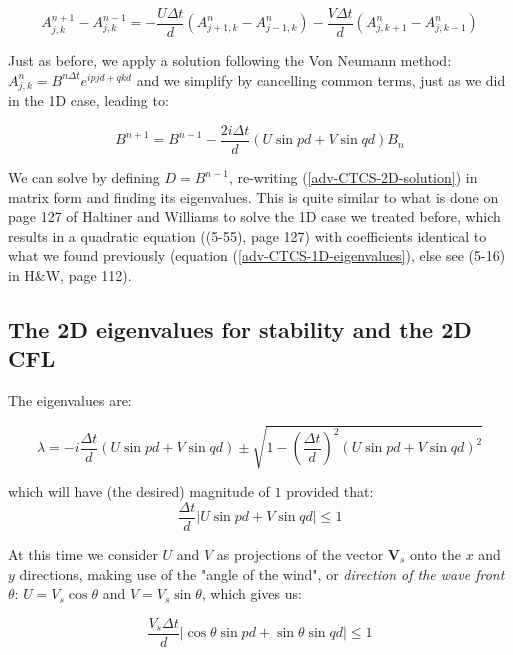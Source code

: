 	\begin{equation}
		{A_{j,k}^{n+1}-A_{j,k}^{n-1}} = - \frac{ U \Delta t}{d} \left( A_{j+1,k}^{n} - A_{j-1,k}^{n}  \right) - \frac{ V \Delta t}{d} \left( A_{j,k+1}^{n} - A_{j,k-1}^{n}  \right) 
		\label{adv-CTCS-2D}
	\end{equation}
	
	Just as before, we apply a solution following the Von Neumann method: ${A_{j,k}^{n}=B^{n \Delta t} e^{i pjd + qkd }}$ and we simplify by cancelling common terms, just as we did in the 1D case, leading to:
	
	\begin{equation}
		B^{n+1}  =  B^{n-1}  - \frac{2 i \Delta t}{d}  \left ( U \sin pd + V \sin qd \right) B_n
		\label{adv-CTCS-2D-solution}
	\end{equation}
	
	We can solve by defining $D=B^{n-1}$, re-writing (\ref{adv-CTCS-2D-solution}) in matrix form and finding its eigenvalues. This is quite similar to what is done on page 127 of Haltiner and Williams to solve the 1D case we treated before, which results in a quadratic equation ((5-55), page 127) with coefficients identical to what we found previously (equation (\ref{adv-CTCS-1D-eigenvalues}), else see (5-16) in H\&W, page 112).

\subsection{The 2D eigenvalues for stability and the 2D CFL}

	The eigenvalues are:
	
	\begin{equation}
		\lambda = -i \frac{ \Delta t}{d}  \left ( U \sin pd + V \sin qd \right) \pm \sqrt { 1-  (\frac{ \Delta t}{d})^2  \left ( U \sin pd + V \sin qd \right) ^2 }
	\end{equation}
	
	which will have (the desired) magnitude of $1$ provided that: 
	\begin{equation}
		\frac{ \Delta t}{d}  \left | U \sin pd + V \sin qd \right | \leq 1
	\end{equation}
	
	At this time we consider $U$ and $V$ as projections of the vector $\mathbf{V}_s$ onto the $x$ and $y$ directions, making use of the "angle of the wind", or \emph{direction of the wave front} $\theta$: $U=V_s \cos \theta$ and $V=V_s \sin \theta$, which gives us:
	
	
	\begin{equation}
		\frac{ V_s\Delta t}{d}  \left | \cos \theta \sin pd + \sin \theta \sin qd \right | \leq 1
	\end{equation}
	
